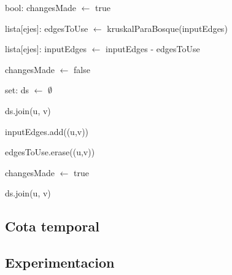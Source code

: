 \begin{algorithm}[H]
		\NoCaptionOfAlgo
		\caption{}
		
		bool: changesMade $\leftarrow$ true
		
		lista[ejes]: edgesToUse $\leftarrow$ kruskalParaBosque(inputEdges)

		lista[ejes]: inputEdges $\leftarrow$ inputEdges - edgesToUse

		{
			changesMade $\leftarrow$ false

			set: ds $\leftarrow$ $\emptyset$

			{
				ds.join(u, v)
			}

			{
					{
						inputEdges.add((u,v))

						edgesToUse.erase((u,v))

						changesMade $\leftarrow$ true
					}
					{
						ds.join(u, v)
					}
			}



		}
	\end{algorithm}

\subsection{Cota temporal}

\subsection{Experimentacion}

\pagebreak



 



